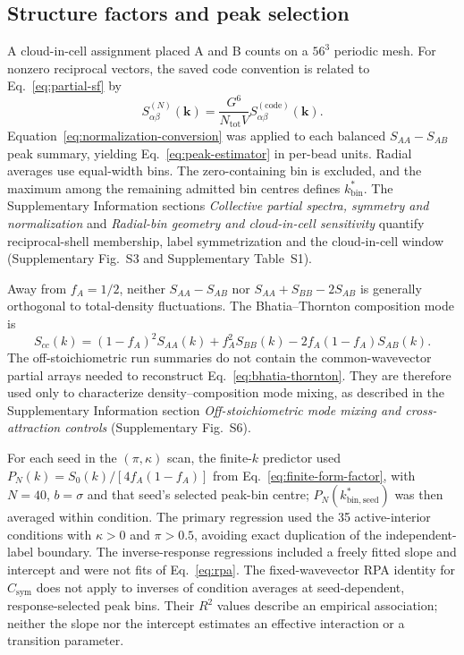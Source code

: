 \documentclass[pdflatex,sn-nature,onecolumn]{sn-jnl}
\begin{document}
\subsection{Structure factors and peak selection}

A cloud-in-cell assignment placed A and B counts on a $56^3$ periodic mesh. For nonzero reciprocal vectors, the saved code convention is related to Eq.~\ref{eq:partial-sf} by
\begin{equation}
S_{\alpha\beta}^{(N)}(\bm{k})=
\frac{G^6}{N_{\mathrm{tot}}V}S_{\alpha\beta}^{(\mathrm{code})}(\bm{k}).
\label{eq:normalization-conversion}
\end{equation}
Equation~\ref{eq:normalization-conversion} was applied to each balanced $S_{AA}-S_{AB}$ peak summary, yielding Eq.~\ref{eq:peak-estimator} in per-bead units. Radial averages use equal-width bins. The zero-containing bin is excluded, and the maximum among the remaining admitted bin centres defines $k_{\mathrm{bin}}^*$. The Supplementary Information sections \emph{Collective partial spectra, symmetry and normalization} and \emph{Radial-bin geometry and cloud-in-cell sensitivity} quantify reciprocal-shell membership, label symmetrization and the cloud-in-cell window (Supplementary Fig.~S3 and Supplementary Table~S1).

Away from $f_A=1/2$, neither $S_{AA}-S_{AB}$ nor $S_{AA}+S_{BB}-2S_{AB}$ is generally orthogonal to total-density fluctuations. The Bhatia--Thornton composition mode is \cite{BhatiaThornton1970}
\begin{equation}
S_{cc}(k)=(1-f_A)^2S_{AA}(k)+f_A^2S_{BB}(k)
-2f_A(1-f_A)S_{AB}(k).
\label{eq:bhatia-thornton}
\end{equation}
The off-stoichiometric run summaries do not contain the common-wavevector partial arrays needed to reconstruct Eq.~\ref{eq:bhatia-thornton}. They are therefore used only to characterize density--composition mode mixing, as described in the Supplementary Information section \emph{Off-stoichiometric mode mixing and cross-attraction controls} (Supplementary Fig.~S6).

For each seed in the $(\pi,\kappa)$ scan, the finite-$k$ predictor used $P_N(k)=S_0(k)/[4f_A(1-f_A)]$ from Eq.~\ref{eq:finite-form-factor}, with $N=40$, $b=\sigma$ and that seed's selected peak-bin centre; $P_N(k_{\mathrm{bin,seed}}^*)$ was then averaged within condition. The primary regression used the 35 active-interior conditions with $\kappa>0$ and $\pi>0.5$, avoiding exact duplication of the independent-label boundary. The inverse-response regressions included a freely fitted slope and intercept and were not fits of Eq.~\ref{eq:rpa}. The fixed-wavevector RPA identity for $C_{\mathrm{sym}}$ does not apply to inverses of condition averages at seed-dependent, response-selected peak bins. Their $R^2$ values describe an empirical association; neither the slope nor the intercept estimates an effective interaction or a transition parameter.
\end{document}
